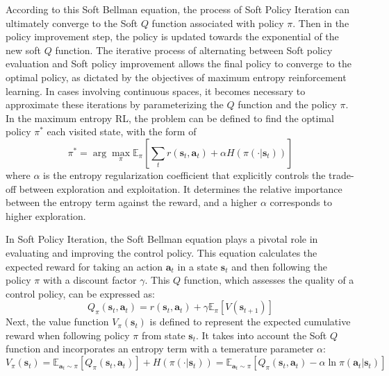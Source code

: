 According to this Soft Bellman equation\cite{haarnojaSoftActorCriticOffPolicy2018}, the process of Soft Policy Iteration can ultimately converge to the Soft $Q$ function associated with policy $\pi$. Then in the policy improvement step, the policy is updated towards the exponential of the new soft $Q$ function. The iterative process of alternating between Soft policy evaluation and Soft policy improvement allows the final policy to converge to the optimal policy, as dictated by the objectives of maximum entropy reinforcement learning. In cases involving continuous spaces, it becomes necessary to approximate these iterations by parameterizing the $Q$ function and the policy $\pi$. In the maximum entropy RL, the problem can be defined to find the optimal policy $\pi^*$ each visited state, with the form of 
\begin{equation}
    \pi^* = \arg\max_\pi\mathbb{E}_\pi [\sum_t r(\mathbf{s}_t,\mathbf{a}_t)+\alpha H(\pi(\cdot|\mathbf{s}_t))]
    \label{eq:bellman}
\end{equation} 
where $\alpha$ is the entropy regularization coefficient that explicitly controls the trade-off between exploration and exploitation. It determines the relative importance between the entropy term against the reward, and a higher $\alpha$ corresponds to higher exploration. 

In Soft Policy Iteration, the Soft Bellman equation plays a pivotal role in evaluating and improving the control policy. This equation calculates the expected reward for taking an action $\mathbf{a}_t$ in a state $\mathbf{s}_t$ and then following the policy $\pi$ with a discount factor $\gamma$.  This $Q$ function, which assesses the quality of a control policy, can be expressed as:
\begin{equation}
    Q_\pi(\mathbf{s}_t,\mathbf{a}_t) = r(\mathbf{s}_t,\mathbf{a}_t) + \gamma\mathbb{E}_{\pi}[V(\mathbf{s}_{t+1})]
    \label{eq:Q}
\end{equation} 
Next, the value function $V_\pi(\mathbf{s}_t)$ is defined to represent the expected cumulative reward when following policy $\pi$ from state $\mathbf{s}_t$. It takes into account the Soft $Q$ function and incorporates an entropy term with a temerature parameter $\alpha$:
\begin{equation}
    V_\pi(\mathbf{s}_t) = \mathbb{E}_{\mathbf{a}_t\sim \pi}[Q_\pi(\mathbf{s}_t,\mathbf{a}_t)] + H(\pi(\cdot|\mathbf{s}_t)) = \mathbb{E}_{\mathbf{a}_t\sim \pi}[Q_\pi(\mathbf{s}_t,\mathbf{a}_t) - \alpha\ln\pi(\mathbf{a}_t|\mathbf{s}_t)]
    \label{eq:valuef}
\end{equation}

